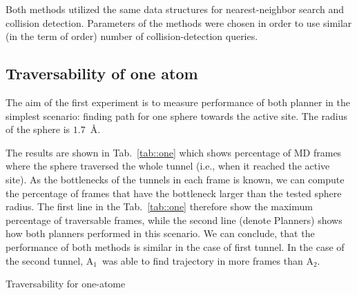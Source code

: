 \documentclass[usletter, 10pt, conference]{ieeeconf} %
\def\RA{A$_{1}$}
\def\RB{A$_{2}$}
\begin{document}
Both methods utilized the same data structures for nearest-neighbor search and collision detection.
Parameters of the methods were chosen in order to use similar (in the term of order) number of collision-detection queries.

\subsection{Traversability of one atom}

The aim of the first experiment is to measure performance of both planner in the simplest scenario: finding path for one sphere towards the active site.
The radius of the sphere is $1.7$~\AA. 

The results are shown in Tab.~\ref{tab::one} which shows percentage of MD frames where the sphere traversed the whole tunnel 
(i.e., when it reached the active site).
As the bottlenecks of the tunnels in each frame is known, we can compute the percentage of frames that have the bottleneck larger
than the tested sphere radius.
The first line in the Tab.~\ref{tab::one} therefore show the maximum percentage of traversable frames, while the second
line (denote Planners) shows how both planners performed in this scenario.
We can conclude, that the performance of both methods is similar in the case of first tunnel.
In the case of the second tunnel, \RA\ was able to find trajectory in more frames than \RB.

\begin{table}
\centering
\caption{\label{tab::one}Traversability for one-atome}
\small
\renewcommand{\tabcolsep}{3.5pt}
{\small

}
\end{table}
\end{document}
